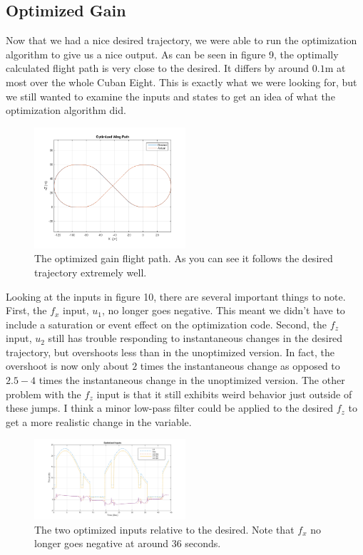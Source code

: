 \documentclass[journal]{IEEEtran}
\begin{document}
\subsection{Optimized Gain}
Now that we had a nice desired trajectory, we were able to run the optimization algorithm to give us a nice output. As can be seen in figure 9, the optimally calculated flight path is very close to the desired. It differs by around $0.1$m at most over the whole Cuban Eight. This is exactly what we were looking for, but we still wanted to examine the inputs and states to get an idea of what the optimization algorithm did.
\begin{figure}[H]
    \centering
    \includegraphics[width=0.5\textwidth]{Flight_Path_Optimized.png}
    \caption{The optimized gain flight path. As you can see it follows the desired trajectory extremely well.}
\end{figure}
\indent Looking at the inputs in figure 10, there are several important things to note. First, the $f_x$ input, $u_1$, no longer goes negative. This meant we didn't have to include a saturation or event effect on the optimization code. Second, the $f_z$ input, $u_2$ still has trouble responding to instantaneous changes in the desired trajectory, but overshoots less than in the unoptimized version. In fact, the overshoot is now only about $2$ times the instantaneous change as opposed to $2.5-4$ times the instantaneous change in the unoptimized version. The other problem with the $f_z$ input is that it still exhibits weird behavior just outside of these jumps. I think a minor low-pass filter could be applied to the desired $f_z$ to get a more realistic change in the variable.
\begin{figure}[H]
    \centering
    \includegraphics[width=0.5\textwidth]{Inputs_Optimized.png}
    \caption{The two optimized inputs relative to the desired. Note that $f_x$ no longer goes negative at around 36 seconds.}
\end{figure}
\end{document}
